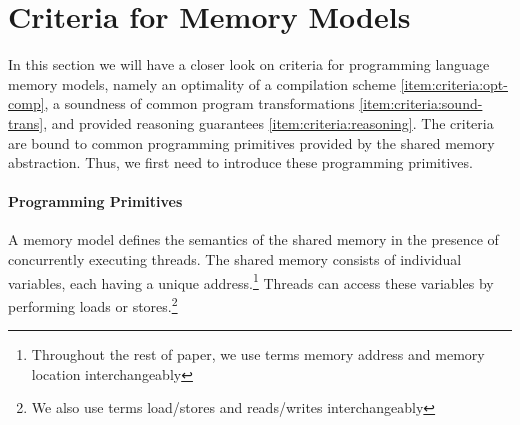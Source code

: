\section{Criteria for Memory Models}
\label{sec:background}

In this section we will have a closer look on criteria for 
programming language memory models, 
namely an optimality of a compilation scheme \ref{item:criteria:opt-comp}, 
a soundness of common program transformations \ref{item:criteria:sound-trans}, 
and provided reasoning guarantees \ref{item:criteria:reasoning}.  
The criteria are bound to common programming primitives 
provided by the shared memory abstraction.
Thus, we first need to introduce these programming primitives. 

\paragraph{Programming Primitives}
\label{sec:background:primitives}


A memory model defines the semantics of the shared memory 
in the presence of concurrently executing threads. 
The shared memory consists of individual variables, 
each having a unique address.\footnote{
Throughout the rest of paper, we use terms 
memory address and memory location interchangeably}
Threads can access these variables by performing 
loads or stores.\footnote{We also use terms 
load/stores and reads/writes interchangeably}

